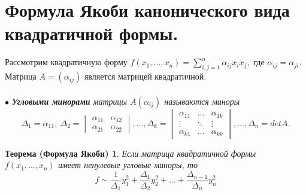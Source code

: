 \section{Формула Якоби канонического вида квадратичной формы.}
Рассмотрим квадратичную форму $f(x_1,\dots,x_n) =\sum\limits^n_{i,j=1}\alpha_{ij}x_ix_j,$ где $\alpha_{ij} = \alpha_{ji}.$ Матрица $A = (\alpha_{ij})$ является матрицей квадратичной.\\\\
$\bullet$\textit{\textbf{ Угловыми минорами} матрицы $A(\alpha_{ij})$ называются миноры} $$\Delta_1 = \alpha_{11},\ \Delta_2 = \begin{vmatrix} \alpha_{11} & \alpha_{12}\\ \alpha_{21} & \alpha_{22} \end{vmatrix}, \dots,\Delta_k = \begin{vmatrix} \alpha_{11} & \dots & \alpha_{1k}\\ \vdots&\ddots&\vdots \\ \alpha_{k1} & \dots & \alpha_{kk} \end{vmatrix}, \dots, \Delta_n = det A.$$
\newtheorem*{th13_3_1}{Теорема (Формула Якоби)}\begin{th13_3_1}Если матрица квадратичной формы $f(x_1,\dots,x_n)$ имеет ненулевые угловые миноры, то $$f\sim\dfrac{1}{\Delta_1}y_1^2+\dfrac{\Delta_1}{\Delta_2}y_2^2+ \ldots +\dfrac{\Delta_{n-1}}{\Delta_n}y_n^2$$
\end{th13_3_1}

